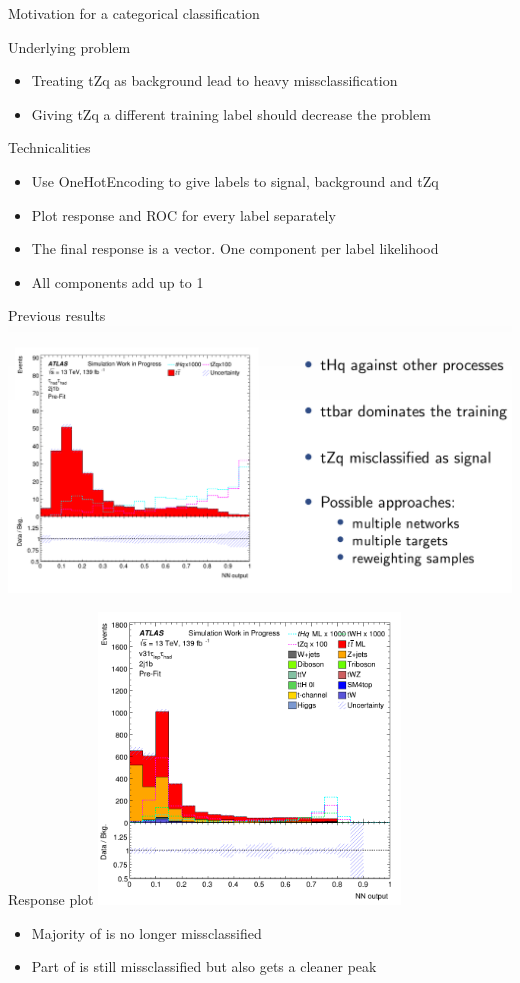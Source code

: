 \begin{frame}{Motivation for a categorical classification}
    \begin{block}{Underlying problem}
        \begin{itemize}
            \item Treating tZq as background lead to heavy missclassification
            \item Giving tZq a different training label should decrease the problem
        \end{itemize}
    \end{block}
    \begin{block}{Technicalities}
        \begin{itemize}
            \item Use OneHotEncoding to give labels to signal, background and tZq
            \item Plot response and ROC for every label separately
            \item The final response is a vector. One component per label likelihood
            \item All components add up to 1 
        \end{itemize}
    \end{block}
\end{frame}

\begin{frame}{Previous results}
    \includegraphics[width=\textwidth]{beforeCat}
\end{frame}

\begin{frame}{Response plot}
    \centering \includegraphics[width=0.6\textwidth]{lephad_cat.png}
    \begin{itemize}
        \item Majority of \tZq is no longer missclassified
        \item Part of \tZq is still missclassified but \tHq also gets a cleaner peak
    \end{itemize}
\end{frame}